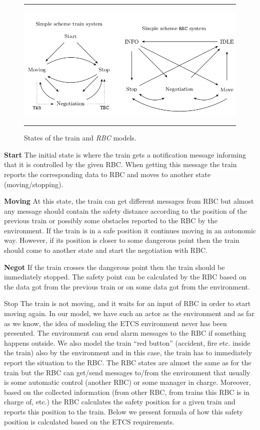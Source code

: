 \documentclass{template/openetcs_article}
\begin{document}
\begin{figure}[t]
\hrule
\sspace
\centering
  \includegraphics[width=.9\textwidth]{figures/ETCSStates.png}
  \caption{States of the train and \textit{RBC} models.}
  \label{fig:states}
\sspace
\hrule
\end{figure}

\textbf{Start} The initial state is where the train gets a notification message informing that it is controlled by the given RBC. When getting this message the train reports the corresponding data to RBC and moves to another state (moving/stopping).

\textbf{Moving} At this state, the train can get different messages from RBC but almost any message should contain the safety distance according to the position of the previous train or possibly some obstacles reported to the RBC by the environment. If the train is in a safe position it continues moving in an autonomic way. However, if its position is closer to some dangerous point then the train should come to another state and start the negotiation with RBC.

\textbf{Negot} If the train crosses the dangerous point then the train should be immediately stopped. The safety point can be calculated by the RBC based on the data got from the previous train or on some data got from the environment.

Stop The train is not moving, and it waits for an input of RBC in order to start moving again. In our model, we have such an actor as the environment and as far as we know, the idea of modeling the ETCS environment never has been presented. The environment can send alarm messages to the RBC if something happens outside. We also model the train “red button” (accident, fire etc. inside the train) also by the environment and in this case, the train has to immediately report the situation to the RBC. The RBC states are almost the same as for the train but the RBC can get/send messages to/from the environment that usually is some automatic control (another RBC) or some manager in charge. Moreover, based on the collected information (from other RBC, from trains this RBC is in charge of, etc.) the RBC calculates the safety position for a given train and reports this position to the train. Below we present formula of how this safety position is calculated based on the ETCS requirements.
\end{document}
